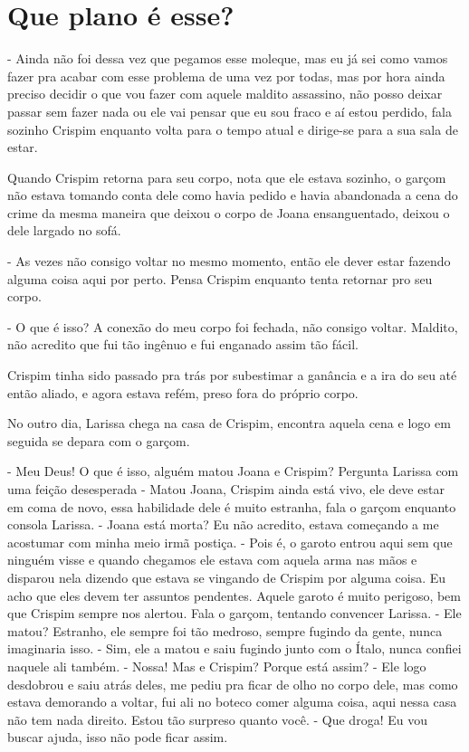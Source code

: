 \chapter{Que plano é esse?}
- Ainda não foi dessa vez que pegamos esse moleque, mas eu já sei como vamos fazer pra acabar com esse problema de uma vez por todas, mas por hora ainda preciso decidir o que vou fazer com aquele maldito assassino, não posso deixar passar sem fazer nada ou ele vai pensar que eu sou fraco e aí estou perdido, fala sozinho Crispim enquanto volta para o tempo atual e dirige-se para a sua sala de estar.

Quando Crispim retorna para seu corpo, nota que ele estava sozinho, o garçom não estava tomando conta dele como havia pedido e havia abandonada a cena do crime da mesma maneira que deixou o corpo de Joana ensanguentado, deixou o dele largado no sofá. 

- As vezes não consigo voltar no mesmo momento, então ele dever estar fazendo alguma coisa aqui por perto. Pensa Crispim enquanto tenta retornar pro seu corpo.

- O que é isso? A conexão do meu corpo foi fechada, não consigo voltar. Maldito, não acredito que fui tão ingênuo e fui enganado assim tão fácil.

Crispim tinha sido passado pra trás por subestimar a ganância e a ira do seu até então aliado, e agora estava refém, preso fora do próprio corpo.

No outro dia, Larissa chega na casa de Crispim, encontra aquela cena e logo em seguida se depara com o garçom.

- Meu Deus! O que é isso, alguém matou Joana e Crispim? Pergunta Larissa com uma feição desesperada
- Matou Joana, Crispim ainda está vivo, ele deve estar em coma de novo, essa habilidade dele é muito estranha, fala o garçom enquanto consola Larissa.
- Joana está morta? Eu não acredito, estava começando a me acostumar com minha meio irmã postiça.
- Pois é, o garoto entrou aqui sem que ninguém visse e quando chegamos ele estava com aquela arma nas mãos e disparou nela dizendo que estava se vingando de Crispim por alguma coisa. Eu acho que eles devem ter assuntos pendentes. Aquele garoto é muito perigoso, bem que Crispim sempre nos alertou. Fala o garçom, tentando convencer Larissa.
- Ele matou? Estranho, ele sempre foi tão medroso, sempre fugindo da gente, nunca imaginaria isso.
- Sim, ele a matou e saiu fugindo junto com o Ítalo, nunca confiei naquele ali também.
- Nossa! Mas e Crispim? Porque está assim?
- Ele logo desdobrou e saiu atrás deles, me pediu pra ficar de olho no corpo dele, mas como estava demorando a voltar, fui ali no boteco comer alguma coisa, aqui nessa casa não tem nada direito. Estou tão surpreso quanto você.
- Que droga! Eu vou buscar ajuda, isso não pode ficar assim.

